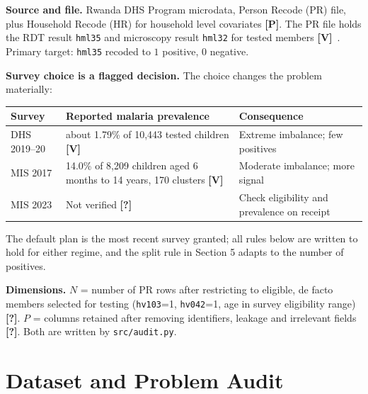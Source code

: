 \documentclass[11pt,a4paper]{article}
\newcommand{\V}{\textbf{[V]}}   %
\newcommand{\Pl}{\textbf{[P]}}   %
\newcommand{\Q}{\textbf{[?]}}   %
\begin{document}
\textbf{Source and file.} Rwanda DHS Program microdata, Person Recode (PR) file, plus Household Recode (HR) for household level covariates \Pl. The PR file holds the RDT result \texttt{hml35} and microscopy result \texttt{hml32} for tested members \V~\cite{dhsguide}. Primary target: \texttt{hml35} recoded to $1$ positive, $0$ negative.

\textbf{Survey choice is a flagged decision.} The choice changes the problem materially:
\begin{center}\small
\begin{tabular}{@{}p{3.6cm}p{4.4cm}p{6cm}@{}}\toprule
Survey & Reported malaria prevalence & Consequence\\\midrule
DHS 2019--20 & about 1.79\% of 10,443 tested children \V~\cite{dhs2019} & Extreme imbalance; few positives\\
MIS 2017 & 14.0\% of 8,209 children aged 6 months to 14 years, 170 clusters \V~\cite{habyarimana2020} & Moderate imbalance; more signal\\
MIS 2023 & Not verified \Q & Check eligibility and prevalence on receipt\\\bottomrule
\end{tabular}\end{center}
The default plan is the most recent survey granted; all rules below are written to hold for either regime, and the split rule in Section 5 adapts to the number of positives.

\textbf{Dimensions.} $N$ = number of PR rows after restricting to eligible, de facto members selected for testing (\texttt{hv103}=1, \texttt{hv042}=1, age in survey eligibility range) \Q. $P$ = columns retained after removing identifiers, leakage and irrelevant fields \Q. Both are written by \texttt{src/audit.py}.

\section{Dataset and Problem Audit}
\end{document}
